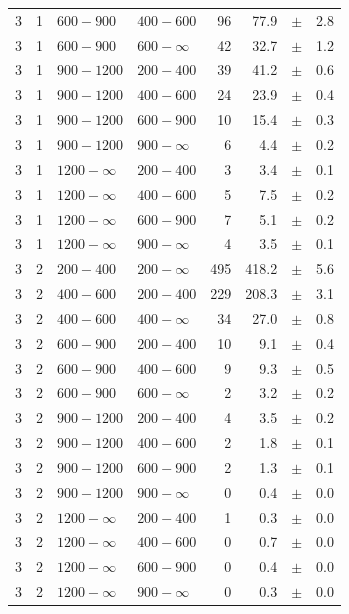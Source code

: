 \begin{table}[!h]
\begin{tabular}{rrllrrcl}
3 & 1 & $ 600- 900$ & $400-600$ &     96 &     77.9 &$\pm$&    2.8 \\
3 & 1 & $ 600- 900$ & $600-\infty$ &     42 &     32.7 &$\pm$&    1.2 \\
3\T & 1 & $ 900-1200$ & $200-400$ &     39 &     41.2 &$\pm$&    0.6 \\
3 & 1 & $ 900-1200$ & $400-600$ &     24 &     23.9 &$\pm$&    0.4 \\
3 & 1 & $ 900-1200$ & $600-900$ &     10 &     15.4 &$\pm$&    0.3 \\
3 & 1 & $ 900-1200$ & $900-\infty$ &      6 &      4.4 &$\pm$&    0.2 \\
3\T & 1 & $1200- \infty$ & $200-400$ &      3 &      3.4 &$\pm$&    0.1 \\
3 & 1 & $1200- \infty$ & $400-600$ &      5 &      7.5 &$\pm$&    0.2 \\
3 & 1 & $1200- \infty$ & $600-900$ &      7 &      5.1 &$\pm$&    0.2 \\
3 & 1 & $1200- \infty$ & $900-\infty$ &      4 &      3.5 &$\pm$&    0.1 \\
3\T & 2 & $ 200- 400$ & $200-\infty$ &    495 &    418.2 &$\pm$&    5.6 \\
3\T & 2 & $ 400- 600$ & $200-400$ &    229 &    208.3 &$\pm$&    3.1 \\
3 & 2 & $ 400- 600$ & $400-\infty$ &     34 &     27.0 &$\pm$&    0.8 \\
3\T & 2 & $ 600- 900$ & $200-400$ &     10 &      9.1 &$\pm$&    0.4 \\
3 & 2 & $ 600- 900$ & $400-600$ &      9 &      9.3 &$\pm$&    0.5 \\
3 & 2 & $ 600- 900$ & $600-\infty$ &      2 &      3.2 &$\pm$&    0.2 \\
3\T & 2 & $ 900-1200$ & $200-400$ &      4 &      3.5 &$\pm$&    0.2 \\
3 & 2 & $ 900-1200$ & $400-600$ &      2 &      1.8 &$\pm$&    0.1 \\
3 & 2 & $ 900-1200$ & $600-900$ &      2 &      1.3 &$\pm$&    0.1 \\
3 & 2 & $ 900-1200$ & $900-\infty$ &      0 &      0.4 &$\pm$&    0.0 \\
3\T & 2 & $1200- \infty$ & $200-400$ &      1 &      0.3 &$\pm$&    0.0 \\
3 & 2 & $1200- \infty$ & $400-600$ &      0 &      0.7 &$\pm$&    0.0 \\
3 & 2 & $1200- \infty$ & $600-900$ &      0 &      0.4 &$\pm$&    0.0 \\
3 & 2 & $1200- \infty$ & $900-\infty$ &      0 &      0.3 &$\pm$&    0.0 \\

\end{tabular}
\end{table}
